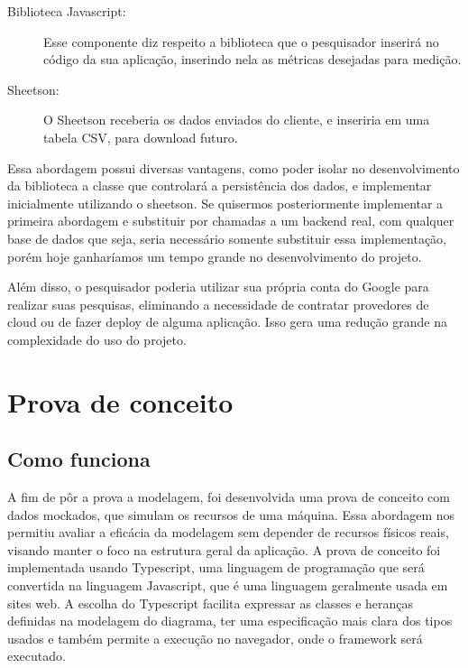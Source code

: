 \documentclass[12pt]{tcc}
\begin{document}
\begin{description}
	\item[Biblioteca Javascript:] Esse componente diz respeito a biblioteca que o pesquisador inserirá no código da sua aplicação, inserindo nela as métricas desejadas para medição.
	
	\item[Sheetson:] O Sheetson receberia os dados enviados do cliente, e inseriria em uma tabela CSV, para download futuro.

\end{description}

Essa abordagem possui diversas vantagens, como poder isolar no desenvolvimento da biblioteca a classe que controlará a persistência dos dados, e implementar inicialmente utilizando o sheetson. Se quisermos posteriormente implementar a primeira abordagem e substituir por chamadas a um backend real, com qualquer base de dados que seja, seria necessário somente substituir essa implementação, porém hoje ganharíamos um tempo grande no desenvolvimento do projeto.

Além disso, o pesquisador poderia utilizar sua própria conta do Google para realizar suas pesquisas, eliminando a necessidade de contratar provedores de cloud ou de fazer deploy de alguma aplicação. Isso gera uma redução grande na complexidade do uso do projeto.



\chapter{Prova de conceito}
\label{cap:prova_de_conceito}
\section{Como funciona}
A fim de pôr a prova a modelagem, foi desenvolvida uma prova de conceito com dados mockados, que simulam os recursos de uma máquina. Essa abordagem nos permitiu avaliar a eficácia da modelagem sem depender de recursos físicos reais, visando manter o foco na estrutura geral da aplicação. A prova de conceito foi implementada usando Typescript, uma linguagem de programação que será convertida na linguagem Javascript, que é uma linguagem geralmente usada em sites web. A escolha do Typescript facilita expressar as classes e heranças definidas na modelagem do diagrama, ter uma especificação mais clara dos tipos usados e também permite a execução no navegador, onde o framework será executado.
\end{document}
